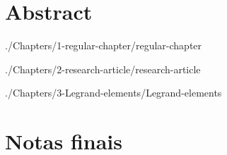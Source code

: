 \documentclass[11pt, %
               oneside] %
               {book}
\begin{document}
\lipsum[1-3]



\chapter*{Abstract}
\thispagestyle{plain}

\lipsum[1-3]


\tableofcontents %
\thispagestyle{plain} %

\cleardoublepage %

\pagestyle{fancy} %



\mainmatter


 {./Chapters/1-regular-chapter/regular-chapter}

 {./Chapters/2-research-article/research-article}

 {./Chapters/3-Legrand-elements/Legrand-elements}





\chapter*{Notas finais}
\begingroup
\let\enotesize\normalsize
\renewcommand\notesname{}
\renewcommand\enoteformat{\noindent[\theenmark]\hspace{0.06in}}
\label{notas}
\theendnotes
\endgroup
\end{document}
